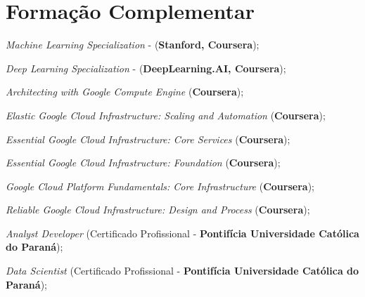 \documentclass[letterpaper,11pt]{article}
\newcommand{\resumeSubHeadingListStart}{\begin{itemize}[leftmargin=*]}
\newcommand{\resumeSubHeadingListEnd}{\end{itemize}}
\begin{document}
 \section{Formação Complementar}
 \resumeSubHeadingListStart
    \color{gray}
    \small{
        \item {\textit{Machine Learning Specialization} - (\textbf{Stanford, Coursera});}
        \item {\textit{Deep Learning Specialization} - (\textbf{DeepLearning.AI, Coursera});}
        \item {\textit{Architecting with Google Compute Engine} (\textbf{Coursera});}
        \item {\textit{Elastic Google Cloud Infrastructure: Scaling and Automation} (\textbf{Coursera});}
        \item {\textit{Essential Google Cloud Infrastructure: Core Services} (\textbf{Coursera});}
        \item {\textit{Essential Google Cloud Infrastructure: Foundation} (\textbf{Coursera});}
        \item {\textit{Google Cloud Platform Fundamentals: Core Infrastructure} (\textbf{Coursera});}
        \item {\textit{Reliable Google Cloud Infrastructure: Design and Process} (\textbf{Coursera});}
        \item {\textit{Analyst Developer} (Certificado Profissional - \textbf{Pontifícia Universidade Católica do Paraná});}
        \item {\textit{Data Scientist} (Certificado Profissional - \textbf{Pontifícia Universidade Católica do Paraná});}
    }
 \resumeSubHeadingListEnd
\end{document}
